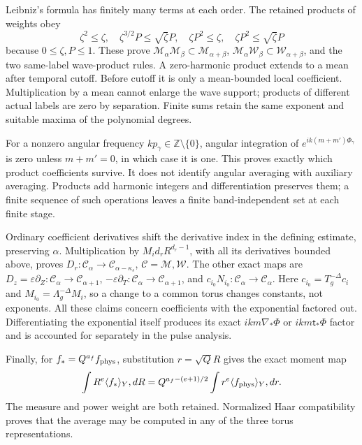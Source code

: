 \documentclass[10pt,a4paper]{article}
\begin{document}
Leibniz's formula has finitely many terms at each order. The retained products of weights obey \[
\zeta^2\le\zeta,\quad\zeta^{3/2}P\le\sqrt\zeta P,
\quad\zeta P^2\le\zeta,\quad\zeta P^2\le\sqrt\zeta P
\] because \(0\le\zeta,P\le1\). These prove \(\mathcal M_\alpha\mathcal M_\beta\subset\mathcal M_{\alpha+\beta}\), \(\mathcal M_\alpha\mathcal W_\beta\subset\mathcal W_{\alpha+\beta}\), and the two same-label wave-product rules. A zero-harmonic product extends to a mean after temporal cutoff. Before cutoff it is only a mean-bounded local coefficient. Multiplication by a mean cannot enlarge the wave support; products of different actual labels are zero by separation. Finite sums retain the same exponent and suitable maxima of the polynomial degrees.

For a nonzero angular frequency \(kp_\gamma\in\mathbb Z\setminus\{0\}\), angular integration of \(e^{ik(m+m')\Phi_\gamma}\) is zero unless \(m+m'=0\), in which case it is one. This proves exactly which product coefficients survive. It does not identify angular averaging with auxiliary averaging. Products add harmonic integers and differentiation preserves them; a finite sequence of such operations leaves a finite band-independent set at each finite stage.

Ordinary coefficient derivatives shift the derivative index in the defining estimate, preserving \(\alpha\). Multiplication by \(M_id_rR^{d_r-1}\), with all its derivatives bounded above, proves \(D_r:\mathcal C_\alpha\to\mathcal C_{\alpha-\kappa_s}\), \(\mathcal C=\mathcal M,\mathcal W\). The other exact maps are \(D_z=\varepsilon\partial_Z:\mathcal C_\alpha\to\mathcal C_{\alpha+1}\), \(-\varepsilon\partial_T:\mathcal C_\alpha\to\mathcal C_{\alpha+1}\), and \(c_{i_0}N_{i_0}:\mathcal C_\alpha\to\mathcal C_\alpha\). Here \(c_{i_0}=T_g^{-\Delta}c_i\) and \(M_{i_0}=\Lambda_g^{-\Delta}M_i\), so a change to a common torus changes constants, not exponents. All these claims concern coefficients with the exponential factored out. Differentiating the exponential itself produces its exact \(ikm\nabla_*\Phi\) or \(ikm\mathsf t_*\Phi\) factor and is accounted for separately in the pulse analysis.

Finally, for \(f_*=Q^{a_f}f_{\rm phys}\), substitution \(r=\sqrt Q R\) gives the exact moment map \[
\int R^e\langle f_*\rangle_Y,dR
=Q^{a_f-(e+1)/2}\int r^e\langle f_{\rm phys}\rangle_Y,dr.
\] The measure and power weight are both retained. Normalized Haar compatibility proves that the average may be computed in any of the three torus representations.
\end{document}
